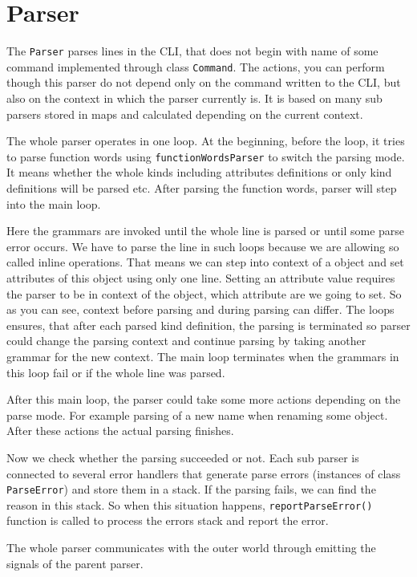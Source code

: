 \documentclass[deska]{subfiles}
\begin{document}
\section{Parser}

The {\tt Parser} parses lines in the CLI, that does not begin with name of some command implemented through class {\tt Command}.
The actions, you can perform though this parser do not depend only on the command written to the CLI, but also on the
context in which the parser currently is. It is based on many sub parsers stored in maps and calculated depending on the current context.

The whole parser operates in one loop. At the beginning, before the loop, it tries to parse function words using
{\tt functionWordsParser} to switch the parsing mode. It means whether the whole kinds including attributes definitions
or only kind definitions will be parsed etc. After parsing the function words, parser will step into the main loop.

Here the grammars are invoked until the whole line is parsed or until some parse error occurs. We have to parse
the line in such loops because we are allowing so called inline operations. That means we can step into context of
a object and set attributes of this object using only one line. Setting an attribute value requires the parser to
be in context of the object, which attribute are we going to set. So as you can see, context before parsing and
during parsing can differ. The loops ensures, that after each parsed kind definition, the parsing is terminated so
parser could change the parsing context and continue parsing by taking another grammar for the new context.
The main loop terminates when the grammars in this loop fail or if the whole line was parsed.

After this main loop, the parser could take some more actions depending on the parse mode. For example parsing of
a new name when renaming some object. After these actions the actual parsing finishes.

Now we check whether the parsing succeeded or not. Each sub parser is connected to several error handlers that
generate parse errors (instances of class {\tt ParseError}) and store them in a stack. If the parsing fails, we can find
the reason in this stack. So when this situation happens, {\tt reportParseError()} function is called to process
the errors stack and report the error.

The whole parser communicates with the outer world through emitting the signals of the parent parser.
\end{document}
